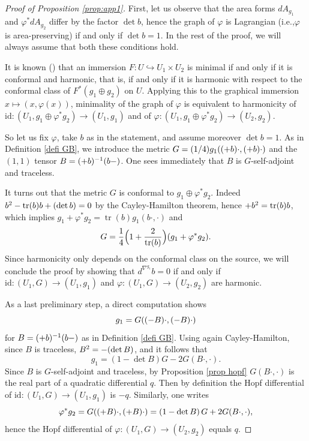 \documentclass[11pt]{article}
\makeatletter
\newcommand{\ie}{i.e.,\xspace}
\DeclareRobustCommand{\mathbbm}[1]{\csname jepbb@#1\endcsname}
\theoremstyle{definition}
\DeclareMathOperator{\tr}{tr}
\makeatother
\begin{document}
\begin{proof}[Proof of Proposition \ref{prop:app1}]
First, let us observe that the area forms $dA_{g_1}$ and $\varphi^*dA_{g_2}$ differ by the factor $\det b$, hence the graph of $\varphi$ is Lagrangian (\ie $\varphi$ is area-preserving) if and only if $\det b=1$. In the rest of the proof, we will always assume that both these conditions hold.

It is known (\cite[\S 4]{zbMATH03198580}) that an immersion $F:U\hookrightarrow U_1\times U_2$ is minimal if and only if it is conformal and harmonic, that is, if and only if it is harmonic with respect to the conformal class of $F^*(g_1\oplus g_2)$ on $U$. Applying this to the graphical immersion $x\mapsto (x,\varphi(x))$, minimality of the graph of $\varphi$ is equivalent to harmonicity of $\mathrm{id}:(U_1,g_1\oplus \varphi^*g_2)\to (U_1,g_1)$ and of $\varphi:(U_1,g_1\oplus \varphi^*g_2)\to (U_2,g_2)$.

So let us fix $\varphi$, take $b$ as in the statement, and assume moreover $\det b=1$. As in Definition \ref{defi GB}, we introduce the metric $G=(1/4)g_1((\mathbbm 1+b)\cdot,(\mathbbm 1+b)\cdot)$ and the $(1,1)$ tensor $B=(\mathbbm 1+b)^{-1}(b-\mathbbm 1)$. One sees immediately that $B$ is $G$-self-adjoint and traceless.

It turns out that the metric $G$ is conformal to $g_1\oplus\varphi^*g_2$. Indeed $b^2-\tr (b)b+(\det b)\mathbbm 1=0$ by the Cayley-Hamilton theorem, hence $\mathbbm 1+b^2=\tr (b)b$, which implies $g_1+\varphi^*g_2=\tr (b)g_1(b\cdot,\cdot)$ and
\[
G=\frac{1}{4}\Bigl(1+\frac{2}{\tr (b)} \Bigr)(g_1+\varphi^*g_2).
\]
Since harmonicity only depends on the conformal class on the source, we will conclude the proof by showing that $d^{\nabla^{g_1}}\!b=0$ if and only if $\mathrm{id}:(U_1,G)\to (U_1,g_1)$ and $\varphi:(U_1,G)\to (U_2,g_2)$ are harmonic.

As a last preliminary step, a direct computation shows
\begin{equation}\label{eq:g1andG}
g_1=G((\mathbbm 1-B)\cdot,(\mathbbm 1-B)\cdot)
\end{equation}
for $B=(\mathbbm 1+b)^{-1}(b-\mathbbm 1)$ as in Definition \ref{defi GB}. Using again Cayley-Hamilton, since $B$ is traceless, $B^2=-(\det B)\mathbbm 1$, and it follows that
\[
g_1=\left(1-\det B\right)G-2G(B\cdot,\cdot).
\]
Since $B$ is $G$-self-adjoint and traceless, by Proposition \ref{prop hopf} $G(B\cdot,\cdot)$ is the real part of a quadratic differential $q$. Then by definition the Hopf differential of $\mathrm{id}:(U_1,G)\to (U_1,g_1)$ is $-q$. Similarly, one writes
\[
\varphi^*g_2=G((\mathbbm 1+B)\cdot,(\mathbbm 1+B)\cdot)=\left(1-\det B\right)G+2G(B\cdot,\cdot),
\]
hence the Hopf differential of $\varphi:(U_1,G)\to (U_2,g_2)$ equals $q$.


\end{proof}
\end{document}
